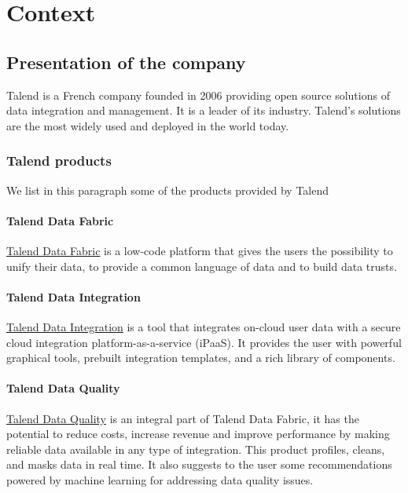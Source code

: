 \chapter*{Context}

\section*{Presentation of the company}
Talend is a French company founded in 2006 providing open source solutions of
data integration and management. It is a leader of its industry. Talend's
solutions are the most widely used and deployed in the world today.

\subsection*{Talend products}
We list in this paragraph some of the products provided by Talend
\subsubsection*{Talend Data Fabric}
\href{https://www.talend.com/products/data-fabric/}{Talend Data Fabric} is a
low-code platform that gives the users the possibility to unify their data, to
provide a common language of data and to build data trusts.

\subsubsection*{Talend Data Integration}
\href{https://www.talend.com/products/integrate-data/}{Talend Data Integration} 
is a tool that integrates on-cloud user data with a secure cloud integration
platform-as-a-service (iPaaS). It provides the user with powerful graphical
tools, prebuilt integration templates, and a rich library of components.

\subsubsection*{Talend Data Quality}
\href{https://www.talend.com/products/data-quality/}{Talend Data Quality} is an
integral part of Talend Data Fabric, it has the potential to reduce costs,
increase revenue and improve performance by making reliable data available in
any type of integration. This product profiles, cleans, and masks data in real
time. It also suggests to the user some recommendations powered by machine
learning for addressing data quality issues.


